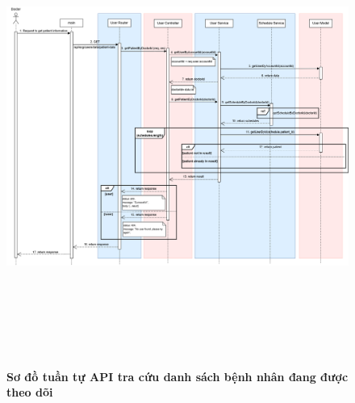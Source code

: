 \begin{figure}[H]
	\centering
	\includegraphics[width=15cm,height=15cm]{Images/api_sequence/user/getPatientByDoctorId.drawio.png}
	\caption[Sơ đồ tuần tự API tra cứu danh sách bệnh nhân đang được theo dõi]{\bfseries \fontsize{12pt}{0pt}\selectfont Sơ đồ tuần tự API tra cứu danh sách bệnh nhân đang được theo dõi}
	\label{sequence_diagram_get_patient_data}
\end{figure}

